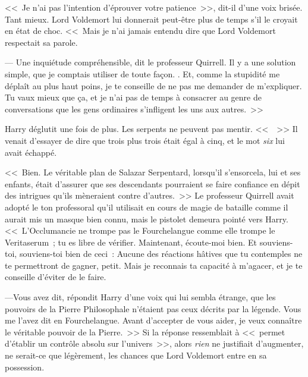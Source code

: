 <<~Je n'ai pas l'intention d'éprouver votre patience~>>, dit-il d'une voix brisée. Tant mieux. Lord Voldemort lui donnerait peut-être plus de temps s'il le croyait en état de choc. <<~Mais je n'ai jamais entendu dire que Lord Voldemort respectait sa parole.

--- Une inquiétude compréhensible, dit le professeur Quirrell. Il y a une solution simple, que je comptais utiliser de toute façon. . Et, comme la stupidité me déplaît au plus haut poins, je te conseille de ne pas me demander de m'expliquer. Tu vaux mieux que ça, et je n'ai pas de temps à consacrer au genre de conversations que les gens ordinaires s'infligent les uns aux autres.~>>

Harry déglutit une fois de plus. Les serpents ne peuvent pas mentir. <<~~>> Il venait d'essayer de dire que trois plus trois était égal à cinq, et le mot \emph{six} lui avait échappé.

<<~Bien. Le véritable plan de Salazar Serpentard, lorsqu'il s'ensorcela, lui et ses enfants, était d'assurer que ses descendants pourraient se faire confiance en dépit des intrigues qu'ils mèneraient contre d'autres.~>> Le professeur Quirrell avait adopté le ton professoral qu'il utilisait en cours de magie de bataille comme il aurait mis un masque bien connu, mais le pistolet demeura pointé vers Harry. <<~L'Occlumancie ne trompe pas le Fourchelangue comme elle trompe le Veritaserum~; tu es libre de vérifier. Maintenant, écoute-moi bien.  Et souviens-toi, souviens-toi bien de ceci~:  Aucune des réactions hâtives que tu contemples ne te permettront de gagner, petit. Mais je reconnais ta capacité à m'agacer, et je te conseille d'éviter de le faire.

---Vous avez dit, répondit Harry d'une voix qui lui sembla étrange, que les pouvoirs de la Pierre Philosophale n'étaient pas ceux décrits par la légende. Vous me l'avez dit en Fourchelangue. Avant d'accepter de vous aider, je veux connaître le véritable pouvoir de la Pierre.~>> Si la réponse ressemblait à <<~permet d'établir un contrôle absolu sur l'univers~>>, alors \emph{rien} ne justifiait d'augmenter, ne serait-ce que légèrement, les chances que Lord Voldemort entre en sa possession.

